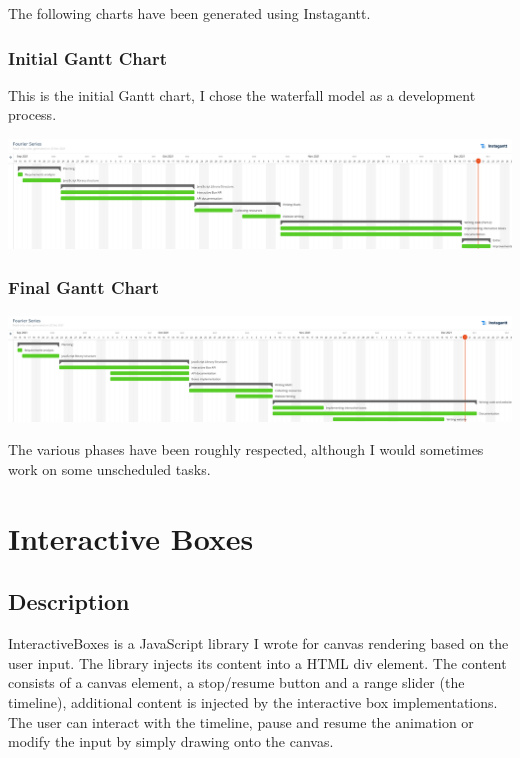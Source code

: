 \documentclass{article}
\begin{document}
The following charts have been generated using Instagantt\cite{instagantt}.

\subsubsection{Initial Gantt Chart}

This is the initial Gantt chart, I chose the waterfall model as a development process.

\includegraphics[width=\textwidth]{gantt1}

\subsubsection{Final Gantt Chart}

\includegraphics[width=\textwidth]{gantt2}

The various phases have been roughly respected, although I would sometimes work on some unscheduled tasks.

\pagebreak

\section{Interactive Boxes}

\subsection{Description}

InteractiveBoxes is a JavaScript library I wrote for canvas rendering based on the user input.
The library injects its content into a HTML div element. The content consists of a canvas element,
a stop/resume button and a range slider (the timeline), additional content is injected by the
interactive box implementations.
The user can interact with the timeline, pause and resume the animation or modify the input by simply drawing onto the canvas.
\end{document}
